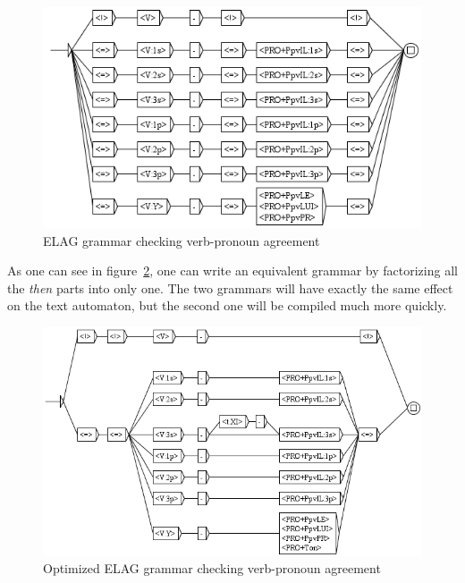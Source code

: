 \begin{figure}[!ht]
\begin{center}
\includegraphics[width=15cm]{resources/img/fig7-21.png}
\caption{ELAG grammar checking verb-pronoun agreement\label{fig-NA-bad}}
\end{center}
\end{figure}

\bigskip
\noindent As one can see in figure~\ref{fig-NA-good}, one can write an
equivalent grammar by factorizing all the \textit{then} parts into only one. The two grammars will have
exactly the same effect on the text automaton, but the second one will be
compiled much more quickly.

\begin{figure}[!ht]
\begin{center}
\includegraphics[width=15cm]{resources/img/fig7-22.png}
\caption{Optimized ELAG grammar checking verb-pronoun
agreement\label{fig-NA-good}}
\end{center}
\end{figure}


